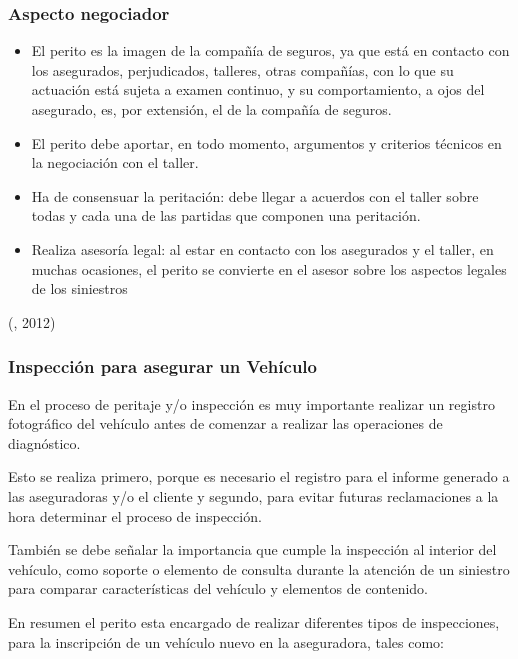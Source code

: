 \subsubsection{Aspecto negociador}
\begin{itemize}

\item El perito es la imagen de la compañía de seguros, ya que está en contacto con los asegurados, perjudicados, talleres, otras compañías, con lo que su actuación está sujeta a examen continuo, y su comportamiento, a ojos del asegurado, es, por extensión, el de la compañía de seguros. 

\item El perito debe aportar, en todo momento, argumentos y criterios técnicos en la negociación con el taller.

\item Ha de consensuar la peritación: debe llegar a acuerdos con el taller sobre todas y cada una de las partidas que componen una peritación.

\item Realiza asesoría legal: al estar en contacto con los asegurados y el taller, en muchas ocasiones, el perito se convierte en el asesor sobre los aspectos legales de los siniestros

\end{itemize}


(\citet{peritobib}, 2012)
\subsubsection{Inspección para asegurar un Vehículo}

En el proceso de peritaje y/o inspección es muy importante realizar un registro fotográfico del vehículo antes de comenzar a realizar las operaciones de diagnóstico.

Esto se realiza primero, porque es necesario el registro para el informe generado a las aseguradoras y/o el cliente y segundo, para evitar futuras reclamaciones a la hora determinar el proceso de inspección.

También se debe señalar la importancia que cumple la inspección al interior del vehículo, como soporte o elemento de consulta durante la atención de un siniestro para comparar características del vehículo y elementos de contenido.

En resumen el perito esta encargado de realizar diferentes tipos de inspecciones, para la inscripción de un vehículo nuevo en la aseguradora, tales como:

